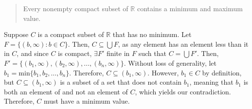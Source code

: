 \documentclass[12pt]{extarticle}
\begin{document}
  \begin{quote}
    Every nonempty compact subset of $\mathbb{R}$ contains a minimum and maximum value.
  \end{quote}
Suppose $C$ is a compact subset of $\mathbb{R}$ that has no minimum. Let $F = \{(b,\infty):b\in C\}$. Then, $C\subseteq \bigcup F$, as any element has an element less than it in $C$, and since $C$ is compact, $\exists F'$ finite in $F$ such that $C = \bigcup F'$. Then, $F' = \{(b_1,\infty),(b_2,\infty),\dots,(b_n,\infty)\}$. Without loss of generality, let $b_1 = \textrm{min}\{b_1,b_2,\dots,b_n\}$. Therefore, $C\subseteq (b_1,\infty)$. However, $b_1\in C$ by definition, but $C\subseteq (b_1,\infty)$ is a subset of a set that does not contain $b_1$, meaning that $b_1$ is both an element of and not an element of $C$, which yields our contradiction. Therefore, $C$ must have a minimum value.\\
\end{document}

